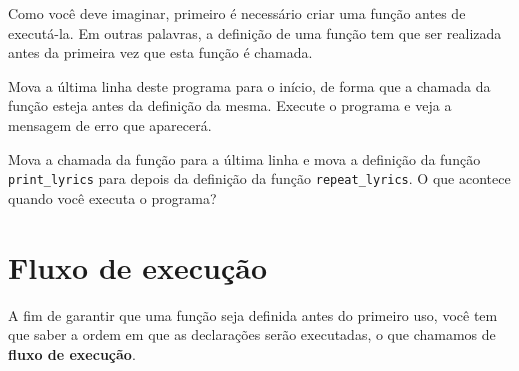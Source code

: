 

Como você deve imaginar, primeiro é necessário criar uma função antes de
executá-la. Em outras palavras, a definição de uma função tem que ser
realizada antes da primeira vez que esta função é chamada.

\begin{ex}

Mova a última linha deste programa para o início, de forma que a chamada da
função esteja antes da definição da mesma. Execute o programa e veja a
mensagem de erro que aparecerá.
\end{ex}

\begin{ex}

Mova a chamada da função para a última linha e mova a definição da
função \verb"print_lyrics" para depois da definição da função
\verb"repeat_lyrics". O que acontece quando você executa o programa?
\end{ex}


\section{Fluxo de execução}


A fim de garantir que uma função seja definida antes do primeiro uso, você
tem que saber a ordem em que as declarações serão executadas, o que chamamos
de {\bf fluxo de execução}.


